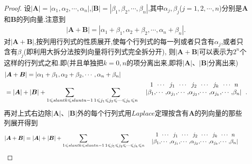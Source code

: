 \documentclass[../../main.tex]{subfiles}
\begin{document}
\begin{proof}
设\(|\boldsymbol{A}| = |\alpha_1,\alpha_2,\cdots,\alpha_n|\),\(|\boldsymbol{B}| = |\beta_1,\beta_2,\cdots,\beta_n|\),其中\(\alpha_j,\beta_j\)(\(j = 1,2,\cdots,n\))分别是\(\boldsymbol{A}\)和\(\boldsymbol{B}\)的列向量.注意到
\begin{align*}
|\boldsymbol{A} + \boldsymbol{B}| = |\alpha_1 + \beta_1,\alpha_2 + \beta_2,\cdots,\alpha_n + \beta_n|.
\end{align*}
对\(|\boldsymbol{A} + \boldsymbol{B}|\),按列用行列式的性质展开,使每个行列式的每一列或者只含有\(\alpha_j\),或者只含有\(\beta_j\)(即利用大拆分法按列向量将行列式完全拆分开),
则\(|\boldsymbol{A} + \boldsymbol{B}|\)可以表示为\(2^n\)个这样的行列式之和.即(并且单独把\(k = 0,n\)的项分离出来,即将\(|\boldsymbol{A}|\)、\(|\boldsymbol{B}|\)分离出来)
\begin{align*}
&|\boldsymbol{A} + \boldsymbol{B}| = |\alpha_1 + \beta_1,\alpha_2 + \beta_2,\cdots,\alpha_n + \beta_n| 
\\
&=|\boldsymbol{A}|+|\boldsymbol{B}|+\sum_{1\leqslant slant k\leqslant slant n-1}{\sum_{1\leqslant  j_1\leqslant  j_2\leqslant  \cdots\leqslant  j_k\leqslant  n}{\begin{array}{c}
\begin{array}{c@{}c@{}c@{}c@{}c@{}c@{}c@{}c@{}c@{}c@{}c@{}}
& 1 & \cdots & j_1 &\cdots &j_2 &\cdots &j_k &\cdots &n \\
\left.\right|
&\beta _1,&\cdots ,&\alpha _{j_1},&\cdots ,&\alpha_{j_2},&\cdots ,&\alpha_{j_k},&\cdots ,&\beta_n& \left|\right.
\end{array}\\
\\
\end{array}}}.
\end{align*}
再对上式右边除\(|\boldsymbol{A}|\)、\(|\boldsymbol{B}|\)外的每个行列式用\(Laplace\)定理按含有\(\boldsymbol{A}\)的列向量的那些列展开得到
\begin{align*}
&|\boldsymbol{A} + \boldsymbol{B}| =|\boldsymbol{A}|+|\boldsymbol{B}|+\sum_{1\leqslant slant k\leqslant slant n-1}{\sum_{1\leqslant  j_1\leqslant  j_2\leqslant  \cdots\leqslant  j_k\leqslant  n}{\begin{array}{c}
\begin{array}{c@{}c@{}c@{}c@{}c@{}c@{}c@{}c@{}c@{}c@{}c@{}}
& 1 & \cdots & j_1 &\cdots &j_2 &\cdots &j_k &\cdots &n \\
\left.\right|
&\beta _1,&\cdots ,&\alpha _{j_1},&\cdots ,&\alpha_{j_2},&\cdots ,&\alpha_{j_k},&\cdots ,&\beta_n& \left|\right.
\end{array}\\

\end{array}}}
\end{align*}
\end{proof}
\end{document}

